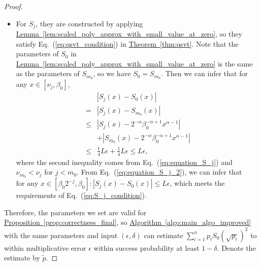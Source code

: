 \documentclass[journal]{IEEEtran}
\newcommand{\eq}[1]{Eq.~(\ref{eq:#1})}
\newcommand{\thm}[1]{\hyperref[thm:#1]{Theorem~\ref*{thm:#1}}}
\newcommand{\lem}[1]{\hyperref[lem:#1]{Lemma~\ref*{lem:#1}}}
\newcommand{\prop}[1]{\hyperref[prop:#1]{Proposition~\ref*{prop:#1}}}
\newcommand{\algo}[1]{\hyperref[algo:#1]{Algorithm~\ref*{algo:#1}}}
\begin{document}
\begin{proof}
\begin{itemize}
        From \eq{approximation_large_alpha_final}, we have
        \begin{align}
            \sum_{i=1}^n p_iS_0(\sqrt{p_i})^2 &\ge  2^{-2\alpha}(p^*)^{1-\alpha}P_{\alpha}(\mathbf{p}) - L\epsilon\nonumber\\ &\ge \frac{P}{b}2^{-2\alpha}(p^*)^{1-\alpha} - L\epsilon \nonumber\\
            &\ge \frac{a}{b}2^{-2\alpha}p^* - L\epsilon = 2L- L\epsilon \ge L.
        \end{align}
    Therefore, $L$ is a lower bound of $\sum_{i=1}^n p_i S_0(\sqrt{p_i})^2$.
    \item For $S_j$, they are constructed by applying \lem{scaled_poly_approx_with_small_value_at_zero}, so they satisfy \eq{qsvt_condition} in \thm{qsvt}.
    Note that the parameters of $S_0$ in \lem{scaled_poly_approx_with_small_value_at_zero} is the same as the parameters of $S_{m_0}$, so we have $S_0 = S_{m_0}$. Then we can infer that for any  $x\in [\nu_j,\beta_0]$, 
    \begin{align}
        &|S_j(x)-S_0(x)|\nonumber \\ = & |S_j(x)-S_{m_0}(x)| \nonumber\\
        \le& |S_j(x)-2^{-\alpha}\beta_0^{-\alpha+1}x^{\alpha-1}| \nonumber \\ &+  |S_{m_0}(x)-2^{-\alpha}\beta_0^{-\alpha+1}x^{\alpha-1}|\nonumber \\
        \le& \frac{1}{4}L\epsilon +\frac{1}{4}L\epsilon \le L\epsilon  \label{eq:equation_S_j_2},
    \end{align}
    where the second inequality comes from \eq{equation_S_j} and $\nu_{m_0} < \nu_j$ for $j < m_0$.
    From \eq{equation_S_j_2}, we can infer that $\text{for any } x\in [\beta_0 2^{-j},\beta_0]:|S_j(x)-S_0(x)| \le L\epsilon$, which meets the requirements of \eq{S_j_condition}.
    \end{itemize}
    
    Therefore, the parameters we set are valid for \prop{correctness_final}, so \algo{main_algo_improved} with the same parameters and input $(\epsilon,\delta)$ can estimate $\sum_{i=1}^n p_i S_0(\sqrt{p_i})^2$ to within multiplicative error $\epsilon$ within success probability at least $1-\delta$. Denote the estimate by $\tilde{p}$. 
    

\end{proof}
\end{document}
